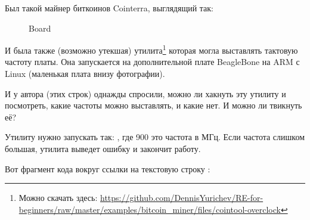
Был такой майнер биткоинов Cointerra, выглядящий так:

\begin{figure}[H]
\centering
{}
\caption{Board}
\end{figure}

И была также (возможно утекшая) утилита\footnote{Можно скачать здесь: \url{https://github.com/DennisYurichev/RE-for-beginners/raw/master/examples/bitcoin_miner/files/cointool-overclock}}
которая могла выставлять тактовую частоту платы.
Она запускается на дополнительной плате BeagleBone на ARM с Linux (маленькая плата внизу фотографии).

И у автора (этих строк) однажды спросили, можно ли хакнуть эту утилиту и посмотреть, какие частоты можно выставлять, и какие нет.
И можно ли твикнуть её?

Утилиту нужно запускать так: , где 900 это частота в МГц.
Если частота слишком большая, утилита выведет ошибку  и закончит работу.

Вот фрагмент кода вокруг ссылки на текстовую строку :

